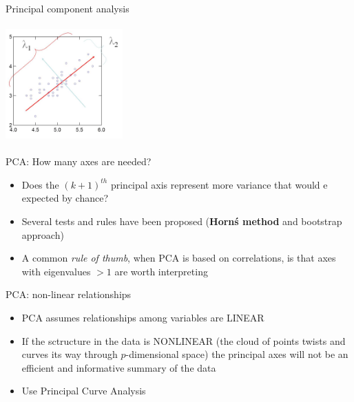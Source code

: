 \documentclass[10pt,xcolor=dvipsnames]{beamer}\usepackage[]{graphicx}\usepackage[]{color}
\begin{document}
\begin{frame}[plain]{Principal component analysis}

 \includegraphics[height=4.5cm, width=4.5cm]{figures/pca2.jpg}
 
\end{frame}


\begin{frame}[plain]{PCA: How many axes are needed?}

\begin{itemize}
 \item Does the $(k+1)^{th}$ principal axis represent more variance that would e expected by chance?
 \item Several tests and rules have been proposed (\textbf{Horn\'s method} and bootstrap approach)
 \item A common \emph{rule of thumb}, when PCA is based on correlations, is that axes with eigenvalues $> 1$ are worth interpreting
\end{itemize}
\end{frame}

\begin{frame}[plain]{PCA: non-linear relationships}

\begin{itemize}
 \item PCA assumes relationships among variables are LINEAR
 \item If the sctructure in the data is NONLINEAR (the cloud of points twists and curves its way through $p$-dimensional space) the principal axes will not be an efficient and informative summary of the data
 \item Use Principal Curve Analysis
\end{itemize}
\end{frame}
\end{document}
